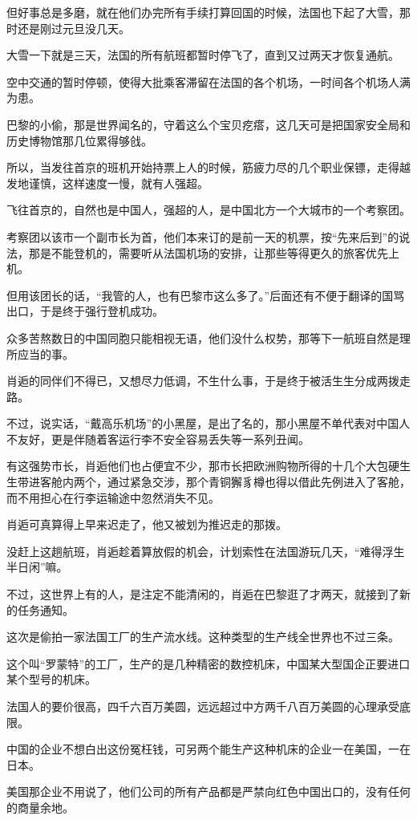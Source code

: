 但好事总是多磨，就在他们办完所有手续打算回国的时候，法国也下起了大雪，那时还是刚过元旦没几天。

大雪一下就是三天，法国的所有航班都暂时停飞了，直到又过两天才恢复通航。

空中交通的暂时停顿，使得大批乘客滞留在法国的各个机场，一时间各个机场人满为患。

巴黎的小偷，那是世界闻名的，守着这么个宝贝疙瘩，这几天可是把国家安全局和历史博物馆那几位累得够戗。

所以，当发往首京的班机开始持票上人的时候，筋疲力尽的几个职业保镖，走得越发地谨慎，这样速度一慢，就有人强超。

飞往首京的，自然也是中国人，强超的人，是中国北方一个大城市的一个考察团。

考察团以该市一个副市长为首，他们本来订的是前一天的机票，按“先来后到”的说法，那是不能登机的，需要听从法国机场的安排，让那些等得更久的旅客优先上机。

但用该团长的话，“我管的人，也有巴黎市这么多了。”后面还有不便于翻译的国骂出口，于是终于强行登机成功。

众多苦熬数日的中国同胞只能相视无语，他们没什么权势，那等下一航班自然是理所应当的事。

肖逅的同伴们不得已，又想尽力低调，不生什么事，于是终于被活生生分成两拨走路。

不过，说实话，“戴高乐机场”的小黑屋，是出了名的，那小黑屋不单代表对中国人不友好，更是伴随着客运行李不安全容易丢失等一系列丑闻。

有这强势市长，肖逅他们也占便宜不少，那市长把欧洲购物所得的十几个大包硬生生带进客舱内两个，通过紧急交涉，那个青铜獬豸樽也得以借此先例进入了客舱，而不用担心在行李运输途中忽然消失不见。

肖逅可真算得上早来迟走了，他又被划为推迟走的那拨。

没赶上这趟航班，肖逅趁着算放假的机会，计划索性在法国游玩几天，“难得浮生半日闲”嘛。

不过，这世界上有的人，是注定不能清闲的，肖逅在巴黎逛了才两天，就接到了新的任务通知。

这次是偷拍一家法国工厂的生产流水线。这种类型的生产线全世界也不过三条。

这个叫“罗蒙特”的工厂，生产的是几种精密的数控机床，中国某大型国企正要进口某个型号的机床。

法国人的要价很高，四千六百万美圆，远远超过中方两千八百万美圆的心理承受底限。

中国的企业不想白出这份冤枉钱，可另两个能生产这种机床的企业一在美国，一在日本。

美国那企业不用说了，他们公司的所有产品都是严禁向红色中国出口的，没有任何的商量余地。


